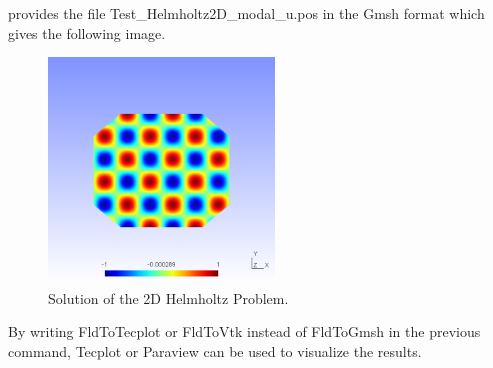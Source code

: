 \normalsize 
provides the file Test\_Helmholtz2D\_modal\_u.pos in the Gmsh format which gives the following image.
 
 \begin{figure}[h!]
\begin{center}
\includegraphics[width=6cm]{Figures/Helmholtz2D}
\caption{Solution of the 2D Helmholtz Problem.}
\end{center}
\end{figure}

By writing FldToTecplot or FldToVtk instead of FldToGmsh in the previous command, Tecplot or Paraview can be used to visualize the results.


